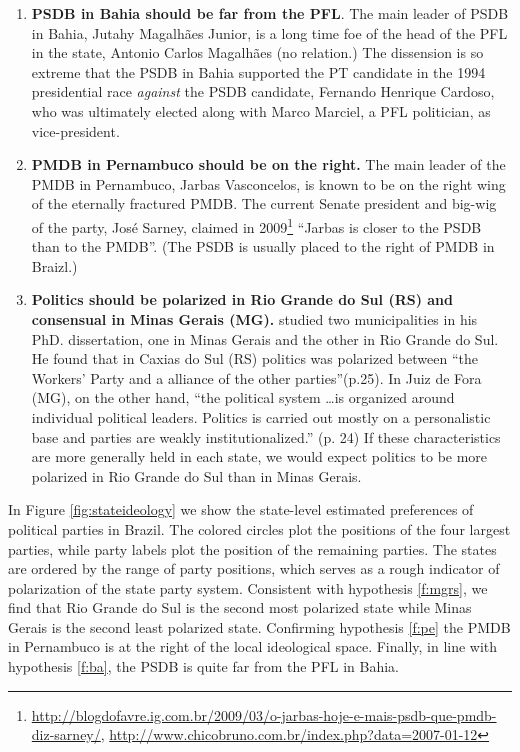 \begin{enumerate}
\item \label{f:ba} \textbf{PSDB in Bahia should be far from the PFL}. The main leader of PSDB in Bahia, Jutahy Magalhães Junior, is a long time foe of the head  of the  PFL in the state, Antonio Carlos Magalhães (no relation.) The dissension is so extreme that the PSDB in Bahia supported the PT candidate in the 1994 presidential race \emph{against} the PSDB candidate, Fernando Henrique Cardoso, who was ultimately elected along with Marco Marciel, a PFL politician,  as vice-president. 

\item \label{f:pe} \textbf{PMDB in Pernambuco should be on the right.} The main leader of the PMDB in Pernambuco, Jarbas Vasconcelos, is known to be on the right wing of the eternally fractured PMDB. The current Senate president and big-wig of the party, José Sarney, claimed in 2009\footnote{\url{http://blogdofavre.ig.com.br/2009/03/o-jarbas-hoje-e-mais-psdb-que-pmdb-diz-sarney/}, \url{http://www.chicobruno.com.br/index.php?data=2007-01-12}} ``Jarbas is closer to the PSDB than to the PMDB''. (The PSDB is usually placed to the right of PMDB in Braizl.)


\item \label{f:mgrs} \textbf{Politics should be polarized in Rio Grande do Sul (RS) and consensual in Minas Gerais (MG).} \citet{renno:2004} studied two  municipalities in his PhD. dissertation, one in  Minas Gerais  and the other in Rio Grande do Sul. He found that in Caxias do Sul (RS)  politics was polarized  between ``the Workers’ Party and a alliance of the other parties''(p.25).  In Juiz de Fora (MG), on the other hand,   ``the political system \dots is organized around individual political leaders.  Politics is carried out mostly on a personalistic base and parties are weakly institutionalized.'' (p. 24) If these characteristics are more generally held in each state, we would expect politics to be more polarized in Rio Grande do Sul than in Minas Gerais. 
\end{enumerate}

In Figure \ref{fig:stateideology} we show the state-level estimated preferences of political parties in Brazil. The colored circles plot the positions of the four largest parties, while party labels plot the position of the remaining parties. The states are ordered by the range of party positions, which serves as a rough indicator of polarization of the state party system.  Consistent with hypothesis   \ref{f:mgrs}, we find that Rio Grande do Sul  is the second most polarized state while Minas Gerais is the second least polarized state. Confirming hypothesis \ref{f:pe}  the PMDB in Pernambuco is at the right of the local ideological space. Finally, in line with hypothesis \ref{f:ba},   the PSDB  is quite far from the PFL in Bahia.  

